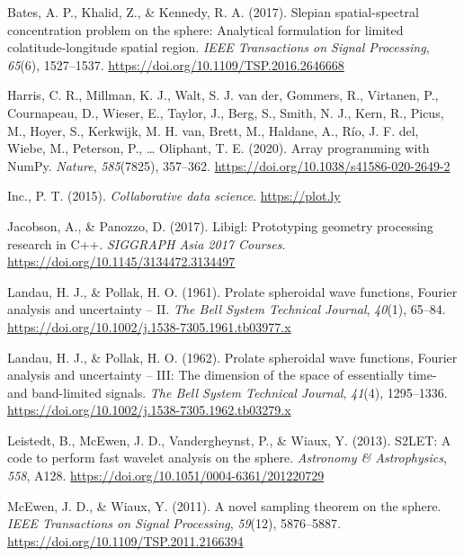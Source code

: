 \documentclass[
]{article}
\newlength{\cslhangindent}
\newlength{\cslentryspacingunit} %
\newenvironment{CSLReferences}[2] %
 {%
  \setlength{\parindent}{0pt}
  \ifodd #1
  \let\oldpar\par
  \def\par{\hangindent=\cslhangindent\oldpar}
  \fi
  \setlength{\parskip}{#2\cslentryspacingunit}
 }%
 {}
\begin{document}
\hypertarget{refs}{}
\begin{CSLReferences}{1}{0}
\leavevmode{}%
Bates, A. P., Khalid, Z., \& Kennedy, R. A. (2017). Slepian
spatial-spectral concentration problem on the sphere: Analytical
formulation for limited colatitude-longitude spatial region. \emph{IEEE
Transactions on Signal Processing}, \emph{65}(6), 1527--1537.
\url{https://doi.org/10.1109/TSP.2016.2646668}

\leavevmode{}%
Harris, C. R., Millman, K. J., Walt, S. J. van der, Gommers, R.,
Virtanen, P., Cournapeau, D., Wieser, E., Taylor, J., Berg, S., Smith,
N. J., Kern, R., Picus, M., Hoyer, S., Kerkwijk, M. H. van, Brett, M.,
Haldane, A., Río, J. F. del, Wiebe, M., Peterson, P., \ldots{} Oliphant,
T. E. (2020). Array programming with {NumPy}. \emph{Nature},
\emph{585}(7825), 357--362.
\url{https://doi.org/10.1038/s41586-020-2649-2}

\leavevmode{}%
Inc., P. T. (2015). \emph{Collaborative data science}.
\url{https://plot.ly}

\leavevmode{}%
Jacobson, A., \& Panozzo, D. (2017). Libigl: Prototyping geometry
processing research in {C}++. \emph{SIGGRAPH Asia 2017 Courses}.
\url{https://doi.org/10.1145/3134472.3134497}

\leavevmode{}%
Landau, H. J., \& Pollak, H. O. (1961). Prolate spheroidal wave
functions, {F}ourier analysis and uncertainty -- {II}. \emph{The Bell
System Technical Journal}, \emph{40}(1), 65--84.
\url{https://doi.org/10.1002/j.1538-7305.1961.tb03977.x}

\leavevmode{}%
Landau, H. J., \& Pollak, H. O. (1962). Prolate spheroidal wave
functions, {F}ourier analysis and uncertainty -- {III}: The dimension of
the space of essentially time- and band-limited signals. \emph{The Bell
System Technical Journal}, \emph{41}(4), 1295--1336.
\url{https://doi.org/10.1002/j.1538-7305.1962.tb03279.x}

\leavevmode{}%
Leistedt, B., McEwen, J. D., Vandergheynst, P., \& Wiaux, Y. (2013).
S2LET: A code to perform fast wavelet analysis on the sphere.
\emph{Astronomy \& Astrophysics}, \emph{558}, A128.
\url{https://doi.org/10.1051/0004-6361/201220729}

\leavevmode{}%
McEwen, J. D., \& Wiaux, Y. (2011). A novel sampling theorem on the
sphere. \emph{IEEE Transactions on Signal Processing}, \emph{59}(12),
5876--5887. \url{https://doi.org/10.1109/TSP.2011.2166394}


\end{CSLReferences}
\end{document}
